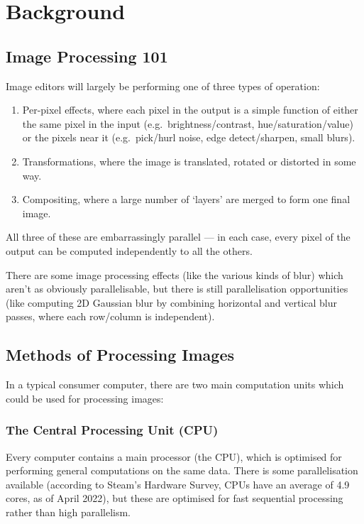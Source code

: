 \documentclass[12pt]{article}
\begin{document}
\section{Background}

\subsection{Image Processing 101}

Image editors will largely be performing one of three types of operation:

\begin{enumerate}
    \item Per-pixel effects, where each pixel in the output is a simple function of either the same
        pixel in the input (e.g.\ brightness/contrast, hue/saturation/value) or the pixels near it
        (e.g.\ pick/hurl noise, edge detect/sharpen, small blurs).
    \item Transformations, where the image is translated, rotated or distorted in some way.
    \item Compositing, where a large number of `layers' are merged to form one final image.
\end{enumerate}

All three of these are embarrassingly parallel --- in each case, every pixel of the output can be
computed independently to all the others.

There are some image processing effects (like the various kinds of blur) which aren't as obviously
parallelisable, but there is still parallelisation opportunities (like computing 2D Gaussian blur by
combining horizontal and vertical blur passes, where each row/column is independent).



\subsection{Methods of Processing Images}

In a typical consumer computer, there are two main computation units which could be used for
processing images:

\subsubsection{The Central Processing Unit (CPU)}

Every computer contains a main processor (the CPU), which is optimised for performing general
computations on the same data.  There is some parallelisation available (according to Steam's
Hardware Survey, CPUs have an average of 4.9 cores, as of April 2022), but these are optimised for
fast sequential processing rather than high parallelism.
\end{document}
